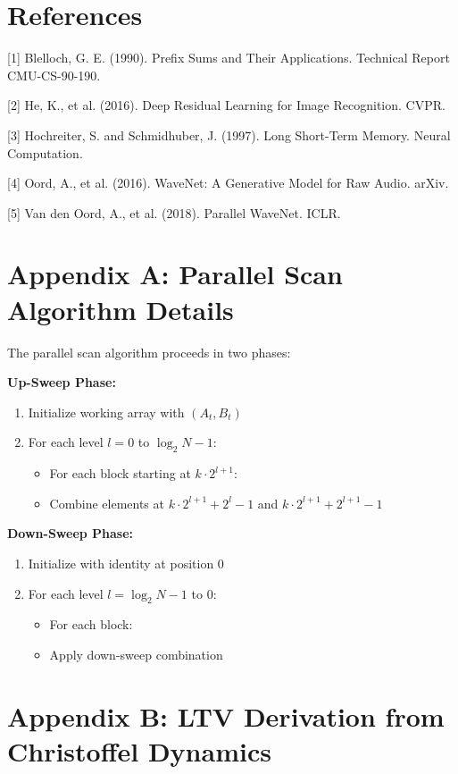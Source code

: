 \documentclass[12pt]{article}
\begin{document}
\section*{References}

[1] Blelloch, G. E. (1990). Prefix Sums and Their Applications. Technical Report CMU-CS-90-190.

[2] He, K., et al. (2016). Deep Residual Learning for Image Recognition. CVPR.

[3] Hochreiter, S. and Schmidhuber, J. (1997). Long Short-Term Memory. Neural Computation.

[4] Oord, A., et al. (2016). WaveNet: A Generative Model for Raw Audio. arXiv.

[5] Van den Oord, A., et al. (2018). Parallel WaveNet. ICLR.

\appendix

\section*{Appendix A: Parallel Scan Algorithm Details}

The parallel scan algorithm proceeds in two phases:

\textbf{Up-Sweep Phase:}
\begin{enumerate}
\item Initialize working array with $(A_t, B_t)$
\item For each level $l = 0$ to $\log_2 N - 1$:
   \begin{itemize}
   \item For each block starting at $k \cdot 2^{l+1}$:
     \item Combine elements at $k \cdot 2^{l+1} + 2^l - 1$ and $k \cdot 2^{l+1} + 2^{l+1} - 1$
   \end{itemize}
\end{enumerate}

\textbf{Down-Sweep Phase:}
\begin{enumerate}
\item Initialize with identity at position 0
\item For each level $l = \log_2 N - 1$ to 0:
   \begin{itemize}
   \item For each block:
     \item Apply down-sweep combination
   \end{itemize}
\end{enumerate}

\section*{Appendix B: LTV Derivation from Christoffel Dynamics}
\end{document}

